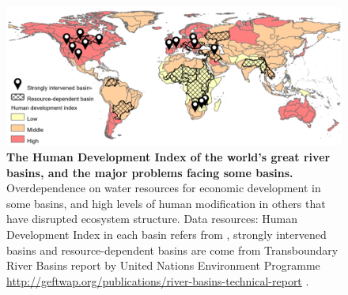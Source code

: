 \documentclass[9pt, twocolumn, twoside, lineno]{pnas-new}
\begin{document}
\begin{figure}%
	\centering
	\includegraphics[width=\linewidth]{../../figures/main/map.pdf}
	\caption{
		\textbf{The Human Development Index of the world's great river basins, and the major problems facing some basins.}
		Overdependence on water resources for economic development in some basins, and high levels of human modification in others that have disrupted ecosystem structure. Data resources: Human Development Index in each basin refers from \cite{linkeGlobalHydroenvironmentalSubbasin2019}, strongly intervened basins and resource-dependent basins are come from Transboundary River Basins report by United Nations Environment Programme \url{http://geftwap.org/publications/river-basins-technical-report} \cite{unep-dhiTransboundaryRiverBasins2016}.
	}
	\label{fig:traps}
\end{figure}
\end{document}
